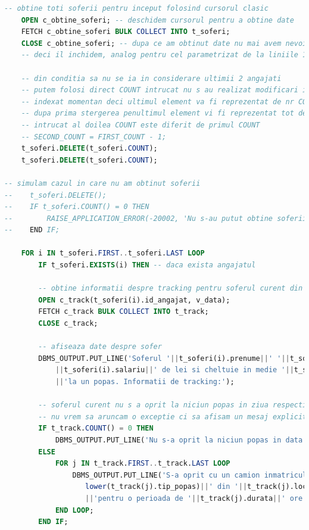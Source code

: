 \documentclass[12pt, a4paper]{article}
\begin{document}
\begin{lstlisting}[language=SQL]
    -- obtine toti soferii pentru inceput folosind cursorul clasic
    OPEN c_obtine_soferi; -- deschidem cursorul pentru a obtine date
    FETCH c_obtine_soferi BULK COLLECT INTO t_soferi;
    CLOSE c_obtine_soferi; -- dupa ce am obtinut date nu mai avem nevoie de cursor 
	-- deci il inchidem, analog pentru cel parametrizat de la liniile 137-139
    
    -- din conditia sa nu se ia in considerare ultimii 2 angajati
    -- putem folosi direct COUNT intrucat nu s au realizat modificari in tabloul
    -- indexat momentan deci ultimul element va fi reprezentat de nr COUNT
    -- dupa prima stergerea penultimul element vi fi reprezentat tot de nr COUNT
    -- intrucat al doilea COUNT este diferit de primul COUNT
    -- SECOND_COUNT = FIRST_COUNT - 1;
    t_soferi.DELETE(t_soferi.COUNT);
    t_soferi.DELETE(t_soferi.COUNT);

-- simulam cazul in care nu am obtinut soferii
--    t_soferi.DELETE();
--    IF t_soferi.COUNT() = 0 THEN
--        RAISE_APPLICATION_ERROR(-20002, 'Nu s-au putut obtine soferii');
--    END IF;

    FOR i IN t_soferi.FIRST..t_soferi.LAST LOOP
        IF t_soferi.EXISTS(i) THEN -- daca exista angajatul
        
        -- obtine informatii despre tracking pentru soferul curent din loop
        OPEN c_track(t_soferi(i).id_angajat, v_data);
        FETCH c_track BULK COLLECT INTO t_track;
        CLOSE c_track;
        
        -- afiseaza date despre sofer
        DBMS_OUTPUT.PUT_LINE('Soferul '||t_soferi(i).prenume||' '||t_soferi(i).nume||' are salariul de '
            ||t_soferi(i).salariu||' de lei si cheltuie in medie '||t_soferi(i).bani_cheltuiti||' lei '
            ||'la un popas. Informatii de tracking:');
         
        -- soferul curent nu s a oprit la niciun popas in ziua respectiva
        -- nu vrem sa aruncam o exceptie ci sa afisam un mesaj explicit pentru acest caz special
        IF t_track.COUNT() = 0 THEN
            DBMS_OUTPUT.PUT_LINE('Nu s-a oprit la niciun popas in data de '||v_data);
        ELSE
            FOR j IN t_track.FIRST..t_track.LAST LOOP
                DBMS_OUTPUT.PUT_LINE('S-a oprit cu un camion inmatriculat '||t_track(j).din_ph||' la un '||
                   lower(t_track(j).tip_popas)||' din '||t_track(j).locatie_popas||' la ora '||t_track(j).ora_sosire||' unde a stat '
                   ||'pentru o perioada de '||t_track(j).durata||' ore.');
            END LOOP;
        END IF;
       

\end{lstlisting}
\end{document}
